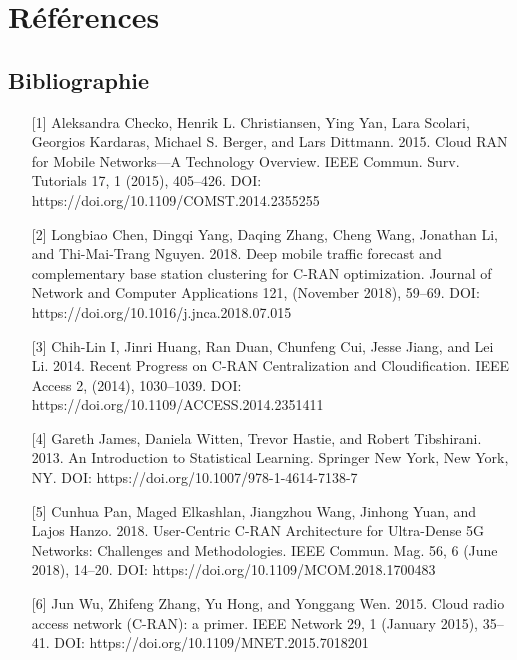 \documentclass{report}
\begin{document}
\chapter*{Références}

\section*{Bibliographie}
\begin{enumerate}
\item[{[1]}] Aleksandra Checko, Henrik L. Christiansen, Ying Yan, Lara Scolari, Georgios Kardaras, Michael S. Berger, and Lars Dittmann. 2015. Cloud RAN for Mobile Networks—A Technology Overview. IEEE Commun. Surv. Tutorials 17, 1 (2015), 405–426. DOI: https://doi.org/10.1109/COMST.2014.2355255
\item[{[2]}] Longbiao Chen, Dingqi Yang, Daqing Zhang, Cheng Wang, Jonathan Li, and Thi-Mai-Trang Nguyen. 2018. Deep mobile traffic forecast and complementary base station clustering for C-RAN optimization. Journal of Network and Computer Applications 121, (November 2018), 59–69. DOI: https://doi.org/10.1016/j.jnca.2018.07.015
\item[{[3]}] Chih-Lin I, Jinri Huang, Ran Duan, Chunfeng Cui, Jesse Jiang, and Lei Li. 2014. Recent Progress on C-RAN Centralization and Cloudification. IEEE Access 2, (2014), 1030–1039. DOI: https://doi.org/10.1109/ACCESS.2014.2351411
\item[{[4]}] Gareth James, Daniela Witten, Trevor Hastie, and Robert Tibshirani. 2013. An Introduction to Statistical Learning. Springer New York, New York, NY. DOI: https://doi.org/10.1007/978-1-4614-7138-7
\item[{[5]}] Cunhua Pan, Maged Elkashlan, Jiangzhou Wang, Jinhong Yuan, and Lajos Hanzo. 2018. User-Centric C-RAN Architecture for Ultra-Dense 5G Networks: Challenges and Methodologies. IEEE Commun. Mag. 56, 6 (June 2018), 14–20. DOI: https://doi.org/10.1109/MCOM.2018.1700483
\item[{[6]}] Jun Wu, Zhifeng Zhang, Yu Hong, and Yonggang Wen. 2015. Cloud radio access network (C-RAN): a primer. IEEE Network 29, 1 (January 2015), 35–41. DOI: https://doi.org/10.1109/MNET.2015.7018201



\end{enumerate}
\end{document}
